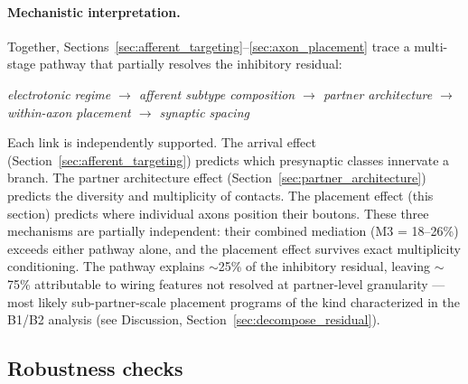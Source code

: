 \documentclass[11pt]{article}
\begin{document}
\paragraph{Mechanistic interpretation.} Together, Sections~\ref{sec:afferent_targeting}--\ref{sec:axon_placement} trace a multi-stage pathway that partially resolves the inhibitory residual:

\begin{center}
\textit{electrotonic regime $\to$ afferent subtype composition $\to$ partner architecture $\to$ within-axon placement $\to$ synaptic spacing}
\end{center}

Each link is independently supported. The arrival effect (Section~\ref{sec:afferent_targeting}) predicts which presynaptic classes innervate a branch. The partner architecture effect (Section~\ref{sec:partner_architecture}) predicts the diversity and multiplicity of contacts. The placement effect (this section) predicts where individual axons position their boutons. These three mechanisms are partially independent: their combined mediation (M3 = 18--26\%) exceeds either pathway alone, and the placement effect survives exact multiplicity conditioning. The pathway explains $\sim$25\% of the inhibitory residual, leaving $\sim$75\% attributable to wiring features not resolved at partner-level granularity --- most likely sub-partner-scale placement programs of the kind characterized in the B1/B2 analysis (see Discussion, Section~\ref{sec:decompose_residual}).


\subsection{Robustness checks}
\label{sec:robustness}
\end{document}
